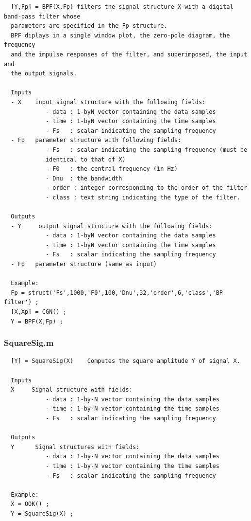 \documentclass{article}
\begin{document}
        \color{lightgray} \begin{verbatim}  [Y,Fp] = BPF(X,Fp) filters the signal structure X with a digital band-pass filter whose 
  parameters are specified in the Fp structure.
  BPF diplays in a single window plot, the zero-pole diagram, the frequency 
  and the impulse responses of the filter, and superimposed, the input and
  the output signals.
 
  Inputs
  - X    input signal structure with the following fields:
            - data : 1-byN vector containing the data samples
            - time : 1-byN vector containing the time samples
            - Fs   : scalar indicating the sampling frequency
  - Fp   parameter structure with following fields:
            - Fs   : scalar indicating the sampling frequency (must be
            identical to that of X)
            - F0   : the central frequency (in Hz)
            - Dnu  : the bandwidth 
            - order : integer corresponding to the order of the filter 
            - class : text string indicating the type of the filter.
 
  Outputs
  - Y     output signal structure with the following fields:
            - data : 1-byN vector containing the data samples
            - time : 1-byN vector containing the time samples
            - Fs   : scalar indicating the sampling frequency
  - Fp   parameter structure (same as input)
 
  Example:
  Fp = struct('Fs',1000,'F0',100,'Dnu',32,'order',6,'class','BP filter') ;  
  [X,Xp] = CGN() ;
  Y = BPF(X,Fp) ;
\end{verbatim} \color{black}



\subsubsection{SquareSig.m}

        \color{black} \begin{verbatim}  [Y] = SquareSig(X)    Computes the square amplitude Y of signal X.
 
  Inputs
  X     Signal structure with fields:
            - data : 1-by-N vector containing the data samples
            - time : 1-by-N vector containing the time samples
            - Fs   : scalar indicating the sampling frequency
 
  Outputs
  Y      Signal structures with fields:
            - data : 1-by-N vector containing the data samples
            - time : 1-by-N vector containing the time samples
            - Fs   : scalar indicating the sampling frequency
 
  Example:
  X = OOK() ;
  Y = SquareSig(X) ;
\end{verbatim} \color{black}
    
\end{document}
